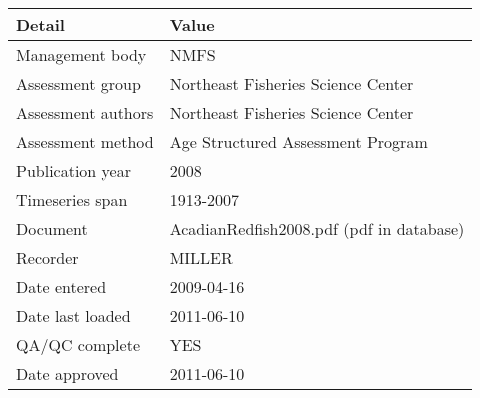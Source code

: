 \begin{table}[htb]
\centering
\begin{tabular}{lp{7cm}}
\toprule
Detail & Value \\
\midrule
Management body    & NMFS                                     \\
Assessment group   & Northeast Fisheries Science Center       \\
Assessment authors & Northeast Fisheries Science Center       \\
Assessment method  & Age Structured Assessment Program        \\
Publication year   & 2008                                     \\
Timeseries span    & 1913-2007                                \\
Document           & AcadianRedfish2008.pdf (pdf in database) \\
Recorder           & MILLER                                   \\
Date entered       & 2009-04-16                               \\
Date last loaded   & 2011-06-10                               \\
QA/QC complete     & YES                                      \\
Date approved      & 2011-06-10                               \\
\bottomrule
\end{tabular}
\label{tab:assessdet}
\end{table}
